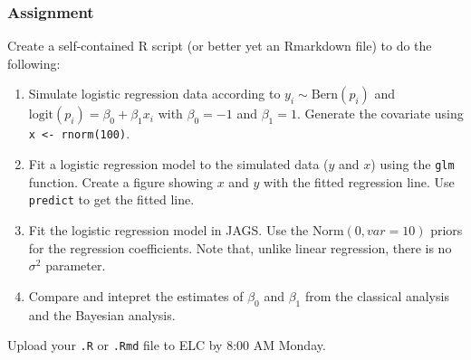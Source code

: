 \documentclass[color=usenames,dvipsnames]{beamer}\usepackage[]{graphicx}\usepackage[]{color}
\newcommand{\inr}[1]{\colorbox{inlinecolor}{\texttt{#1}}}
\begin{document}
\begin{frame}
  \frametitle{Assignment}
  \small
  Create a self-contained R script (or better yet an Rmarkdown file)
  to do the following:
  \begin{enumerate}
    \small
    \item Simulate logistic regression data according to
      $y_i \sim \mathrm{Bern}(p_i)$ and $\mathrm{logit}(p_i) = \beta_0
      + \beta_1 x_i$ with $\beta_0=-1$ and $\beta_1=1$. Generate the
      covariate using \inr{x <- rnorm(100)}.
    \item Fit a logistic regression model to the simulated data ($y$
      and $x$) using the \inr{glm} function. Create a figure showing
      $x$ and $y$ with the fitted regression line. Use
      \inr{predict} to get the fitted line.
    \item Fit the logistic regression model in JAGS. Use the
      $\mathrm{Norm}(0, var=10)$ priors for the regression
      coefficients. Note that, unlike linear regression, there is no
      $\sigma^2$ parameter.
    \item Compare and intepret the estimates of $\beta_0$ and
      $\beta_1$ from the classical analysis and the Bayesian analysis.
  \end{enumerate}
  Upload your {\tt .R} or {\tt .Rmd} file to ELC by 8:00 AM Monday.
\end{frame}
\end{document}
